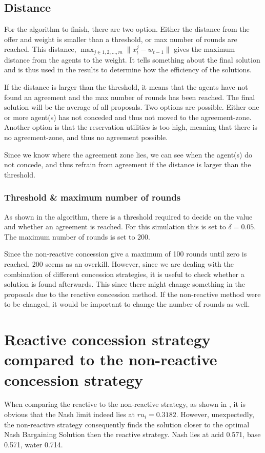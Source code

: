 \subsection{Distance}
For the algorithm  to finish, there are two option. Either the distance from the offer and weight is smaller than a threshold, or max number of rounds are reached. This distance, $\max_{ j \in {1,2,...,m}} \parallel x^j_t-w_{t-1} \parallel$ gives the maximum distance from the agents to the weight. It tells something about the final solution and is thus used in the results to determine how the efficiency of the solutions. 

If the distance is larger than the threshold, it means that the agents have not found an agreement and the max number of rounds has been reached. The final solution will be the average of all proposals. Two options are possible. Either one or more agent(s) has not conceded and thus not moved to the agreement-zone. Another option is that the reservation utilities is too high, meaning that there is no agreement-zone, and thus no agreement possible. 

Since we know where the agreement zone lies, we can see when the agent(s) do not concede, and thus refrain from agreement if the distance is larger than the threshold.


\subsubsection{Threshold \& maximum number of rounds}
As shown in the algorithm, there is a threshold required to decide on the value and whether an agreement is reached. For this simulation this is set to $\delta = 0.05$.	The maximum number of rounds is set to $200$.

Since the non-reactive concession give a maximum of 100 rounds until zero is reached, 200 seems as an overkill. However, since we are dealing with the combination of different concession strategies, it is useful to check whether a solution is found afterwards. This since there might change something in the proposals due to the reactive concession method. If the non-reactive method were to be changed, it would be important to change the number of rounds as well. 

\section{Reactive concession strategy compared to the non-reactive concession strategy}
When comparing the reactive to the non-reactive strategy, as shown in , it is obvious that the Nash limit indeed lies at $ru_i = 0.3182$. However, unexpectedly, the non-reactive strategy consequently finds the solution closer to the optimal Nash Bargaining Solution then the reactive strategy.  Nash lies at acid 0.571, base 0.571, water 0.714.

